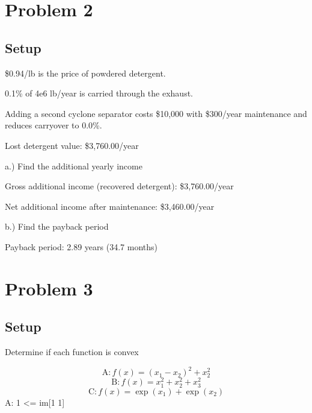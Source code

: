 \documentclass{article}%
\begin{document}
%
\section*{Problem 2}%
\label{sec:Problem2}%
\subsection*{Setup}%
\label{subsec:Setup}%
\$0.94/lb is the price of powdered detergent.%
\par%
0.1\% of 4e6 lb/year is carried through the exhaust.%
\par%
Adding a second cyclone separator costs \$10,000 with \$300/year maintenance and reduces carryover to 0.0\%.%
\par%
Lost detergent value: \$3,760.00/year%
\par%
a.) Find the additional yearly income%
\par%
Gross additional income (recovered detergent): \$3,760.00/year%
\par%
Net additional income after maintenance: \$3,460.00/year%
\par%
b.) Find the payback period%
\par%
Payback period: 2.89 years (34.7 months)%
\par

%
\section*{Problem 3}%
\label{sec:Problem3}%
\subsection*{Setup}%
\label{subsec:Setup}%
Determine if each function is convex%
\par%
\[%
\text{A}: f(x) = (x_1-x_2)^2 + x_2^2%
\]%
\[%
\text{B}: f(x) = x_1^2 + x_2^2+x_3^2%
\]%
\[%
\text{C}: f(x) = \exp(x_1)+\exp(x_2)%
\]%
A: 1 <= im{[}1 1{]}%
\par

%
\end{document}
